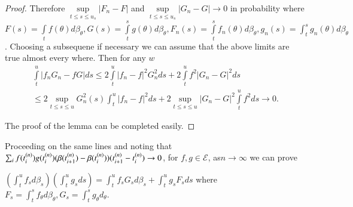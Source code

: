 \begin{proof}
  Therefore $\sup\limits_{ t \leq s \leq u_s} | F_n - F|$ and
  $\sup\limits_{ t \leq s \leq u_s} |G_n - G| \to 0$ in probability
  where $F(s) = \int\limits_t f(\theta) d \beta _\theta , G (s) =
  \int\limits^s_{t} g (\theta) d \beta _\theta, F_n (s) =
  \int\limits^{s}_t f_n (\theta) d \beta _\theta , g_n (s) =
  \int_{t}^{s} g_n (\theta) d \beta_\theta$. Choosing a subsequene if
  necessary we can assume that the above limits are true almost every
  where. Then for any $w$  
\begin{multline*}
\int\limits^{u}_t | f_n G_n - fG | ds \leq 2 \int\limits^u_t |
    f_n - f|^2 G^2_n ds + 2 \int\limits^u_t f^2|G_{n}-G|^{2}ds\\ 
    \leq 2 \sup_{ t \leq s \leq u} G^2 _n (s) \int^u_t | f_n - f| ^2 ds
    + 2 \sup_{ t \leq s \leq u} | G_n - G |^2 \int\limits^u_t f^2 ds \to
    0.  
  \end{multline*}
  
The proof of the lemma can be completed easily. 
\end{proof}

Proceeding on the same lines and noting that 
$\sum_i f (t^{(n)}_i ) g(t_i^{(n)}) (\beta(t^{(n)}_{i +1})\break
-\beta(t_i^{(n)})) (t^{(n)}_{i+1}-t_i^{(n)}) \to 0$,  for $f, g \in
\mathscr{E}$, as\pageoriginale $n \to \infty$ we can prove 

\begin{lem}\label{chap5-sec5-lem2}%
  $(\int ^u_t f_s d \beta _s) (\int^u_t g_s ds ) = \int^u_t f_s G_s d
  \beta _s + \int ^u_t g_s F_s ds$ where $F_s = \int^s_t f_\theta d
  \beta _\theta , G_s = \int^s_t g_\theta d_\theta$.  
\end{lem}

